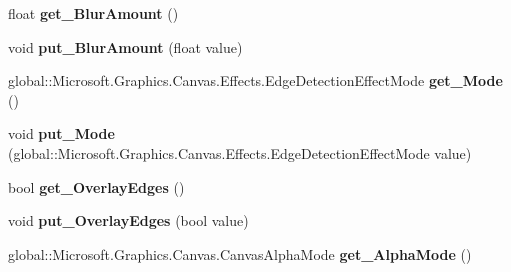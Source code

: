 \begin{DoxyCompactItemize}
float {\bfseries get\+\_\+\+Blur\+Amount} ()
\item 
\mbox{\label{interface_microsoft_1_1_graphics_1_1_canvas_1_1_effects_1_1_i_edge_detection_effect_ae34ee491a4a76a40ac93a1257d408521}} 
void {\bfseries put\+\_\+\+Blur\+Amount} (float value)
\item 
\mbox{\label{interface_microsoft_1_1_graphics_1_1_canvas_1_1_effects_1_1_i_edge_detection_effect_af4eed9893a7039265777bc63d06a5dad}} 
global\+::\+Microsoft.\+Graphics.\+Canvas.\+Effects.\+Edge\+Detection\+Effect\+Mode {\bfseries get\+\_\+\+Mode} ()
\item 
\mbox{\label{interface_microsoft_1_1_graphics_1_1_canvas_1_1_effects_1_1_i_edge_detection_effect_ab506181e7ae373678c372e670ca4e7dc}} 
void {\bfseries put\+\_\+\+Mode} (global\+::\+Microsoft.\+Graphics.\+Canvas.\+Effects.\+Edge\+Detection\+Effect\+Mode value)
\item 
\mbox{\label{interface_microsoft_1_1_graphics_1_1_canvas_1_1_effects_1_1_i_edge_detection_effect_a3d82aa6e19802e82c6cfe865d511e72f}} 
bool {\bfseries get\+\_\+\+Overlay\+Edges} ()
\item 
\mbox{\label{interface_microsoft_1_1_graphics_1_1_canvas_1_1_effects_1_1_i_edge_detection_effect_a14bee1ac205a14649a9a545112bce70b}} 
void {\bfseries put\+\_\+\+Overlay\+Edges} (bool value)
\item 
\mbox{\label{interface_microsoft_1_1_graphics_1_1_canvas_1_1_effects_1_1_i_edge_detection_effect_a54398098083bcd5796ae07a6f2ec7377}} 
global\+::\+Microsoft.\+Graphics.\+Canvas.\+Canvas\+Alpha\+Mode {\bfseries get\+\_\+\+Alpha\+Mode} ()
\item 
\mbox{\label{interface_microsoft_1_1_graphics_1_1_canvas_1_1_effects_1_1_i_edge_detection_effect_af3adb48dad25fee5872063bee9eb520d}} 

\end{DoxyCompactItemize}
